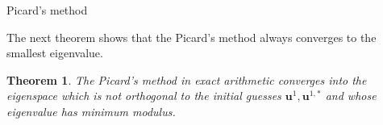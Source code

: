 \documentclass[preprint,12pt]{elsarticle}
\newtheorem{theorem}{Theorem}[section]
\begin{document}
\begin{algorithm}[H] \caption{Picard's method} \label{alg:picard} 
\begin{algorithmic}


\REPEAT

\end{algorithmic}
\end{algorithm}

The next theorem shows that the Picard's method always converges to the smallest eigenvalue.\\

\begin{theorem}\label{th:picard_conv}
The Picard's method in exact arithmetic converges into the eigenspace which is not orthogonal to the initial guesses $\mathbf{u}^1,\mathbf{u}^{1,*}$ and whose eigenvalue has minimum modulus.
\end{theorem}
\end{document}
